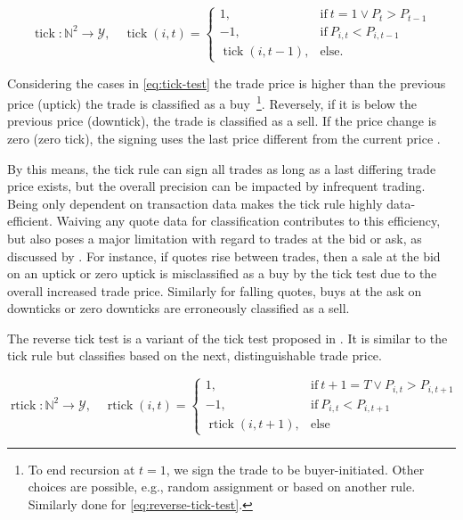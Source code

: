 \begin{equation}
    \operatorname{tick}\colon \mathbb{N}^2 \to \mathcal{Y},\quad
    \operatorname{tick}(i, t)=
    \begin{cases}
        1,                           & \text{if}\ t=1 \lor P_{t}>P_{t-1} \\
        -1,                          & \text{if}\ P_{i, t} < P_{i, t-1}  \\
        \operatorname{tick}(i, t-1), & \text{else}.
    \end{cases}
    \label{eq:tick-test}
\end{equation}

Considering the cases in \cref{eq:tick-test} the trade price is higher than the previous price (uptick) the trade is classified as a buy~\footnote{To end recursion at $t=1$, we sign the trade to be buyer-initiated. Other choices are possible, e.g., random assignment or based on another rule. Similarly done for \cref{eq:reverse-tick-test}.}. Reversely, if it is below the previous price (downtick), the trade is classified as a sell. If the price change is zero (zero tick), the signing uses the last price different from the current price \autocite[][3]{leeInferringTradeDirection1991}.

By this means, the tick rule can sign all trades as long as a last differing trade price exists, but the overall precision can be impacted by infrequent trading. Being only dependent on transaction data makes the tick rule highly data-efficient. Waiving any quote data for classification contributes to this efficiency, but also poses a major limitation with regard to trades at the bid or ask, as discussed by \textcite[][557--558]{finucaneDirectTestMethods2000}. For instance, if quotes rise between trades, then a sale at the bid on an uptick or zero uptick is misclassified as a buy by the tick test due to the overall increased trade price. Similarly for falling quotes, buys at the ask on downticks or zero downticks are erroneously classified as a sell.



The reverse tick test is a variant of the tick test proposed in \textcite[][241]{hasbrouckTradesQuotesInventories1988}. It is similar to the tick rule but classifies based on the next, distinguishable trade price.

\begin{equation}
    \operatorname{rtick} \colon \mathbb{N}^2 \to \mathcal{Y},\quad
    \operatorname{rtick}(i, t)=
    \begin{cases}
        1,                            & \text{if}\ t+1=T \lor P_{i, t} > P_{i, t+1} \\
        -1,                           & \text{if}\ P_{i, t} < P_{i, t+1}            \\
        \operatorname{rtick}(i, t+1), & \text{else}
    \end{cases}
    \label{eq:reverse-tick-test}
\end{equation}

